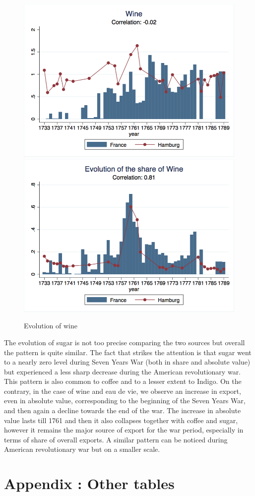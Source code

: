 \documentclass[12pt,a4paper,titlepage,english]{article}
\begin{document}
\begin{figure}
\caption{Evolution of wine}
\includegraphics[scale=.28]{wine_long.png}
\includegraphics[scale=.28]{wine_share_long.png}
\end{figure}
The evolution of sugar is not too precise comparing the two sources but overall the pattern is quite similar. The fact that strikes the attention is that sugar went to a nearly zero level during Seven Years War (both in share and absolute value) but experienced a less sharp decrease during the American revolutionary war. This pattern is also common to coffee and to a lesser extent to Indigo. On the contrary, in the case of wine and eau de vie, we observe an increase in export, even in absolute value, corresponding to the beginning of the Seven Years War, and then again a decline towards the end of the war. The increase in absolute value lasts till 1761 and then it also collapses together with coffee and sugar, however it remains the major source of export for the war period, especially in terms of share of overall exports. A similar pattern can be noticed during American revolutionary war but on a smaller scale. 


\section{Appendix : Other tables}






\end{document}
